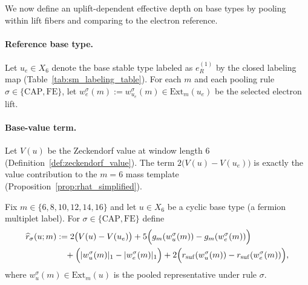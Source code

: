 We now define an uplift-dependent effective depth on base types
by pooling within lift fibers and comparing to the electron reference.

\paragraph{Reference base type.}
Let $u_e\in X_6$ denote the base stable type labeled as $e_R^{(1)}$ by the closed labeling map
(Table~\ref{tab:sm_labeling_table}).
For each $m$ and each pooling rule $\sigma\in\{\mathrm{CAP},\mathrm{FE}\}$,
let $w_{e}^{\sigma}(m):=w^{\sigma}_{u_e}(m)\in \mathrm{Ext}_m(u_e)$ be the selected electron lift.

\paragraph{Base-value term.}
Let $V(u)$ be the Zeckendorf value at window length $6$
(Definition~\ref{def:zeckendorf_value}).
The term $2\bigl(V(u)-V(u_e)\bigr)$ is exactly the value contribution to the $m=6$ mass template
(Proposition~\ref{prop:rhat_simplified}).

\begin{definition}\label{def:mass_flow_rhat}
Fix $m\in\{6,8,10,12,14,16\}$ and let $u\in X_6$ be a cyclic base type (a fermion multiplet label).
For $\sigma\in\{\mathrm{CAP},\mathrm{FE}\}$ define
\begin{equation}\label{eq:mass_flow_rhat_def}
\begin{split}
\widehat r_{\sigma}(u;m)
&:=
2\bigl(V(u)-V(u_e)\bigr)
 + 5\Bigl(g_m(w_u^{\sigma}(m)) - g_m(w_e^{\sigma}(m))\Bigr) \\
&\quad + \Bigl(|w_u^{\sigma}(m)|_1-|w_e^{\sigma}(m)|_1\Bigr)
 + 2\Bigl(r_{\mathrm{suf}}(w_u^{\sigma}(m)) - r_{\mathrm{suf}}(w_e^{\sigma}(m))\Bigr),
\end{split}
\end{equation}
where $w_u^{\sigma}(m)\in \mathrm{Ext}_m(u)$ is the pooled representative under rule $\sigma$.
\end{definition}

